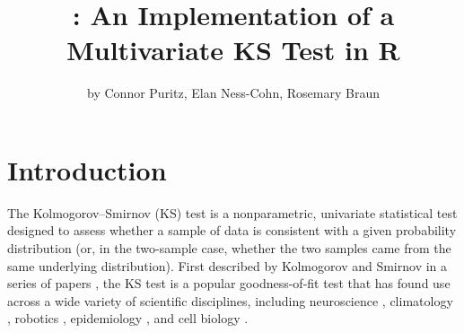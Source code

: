 \title{: An Implementation of a Multivariate KS Test in R}
\author{by Connor Puritz, Elan Ness-Cohn, Rosemary Braun}

\maketitle
{}
 

\section{Introduction}
\label{introduction}
The Kolmogorov--Smirnov (KS) test is a nonparametric, univariate statistical test designed to assess whether a sample of data is consistent with a given probability distribution (or, in the two-sample case, whether the two samples came from the same underlying distribution). First described by Kolmogorov and Smirnov in a series of papers \citep{Kolmogorov1933, Kolmogorov1933a, Smirnov1936, Smirnov1937, Smirnov1939, Smirnov1944, Smirnov1948}, the KS test is a popular goodness-of-fit test that has found use across a wide variety of scientific disciplines, including neuroscience \citep{atasoy_2017}, climatology \citep{chiang_2018}, robotics \citep{hahne_2018}, epidemiology \citep{wong_2020}, and cell biology \citep{kaczanowska_2021}.


